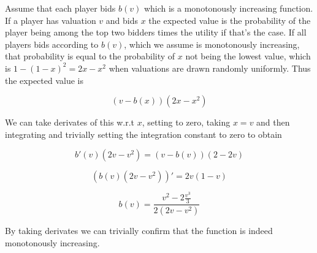 Assume that each player bids $b(v)$ which is a monotonously increasing function. If a player has valuation $v$ and bids $x$ the expected value is the probability of the player being among the top two bidders times the utility if that's the case. If all players bids according to $b(v)$, which we assume is monotonously increasing, that probability is equal to the probability of $x$ not being the lowest value, which is $1-(1-x)^2 = 2x-x^2$ when valuations are drawn randomly uniformly. Thus the expected value is

$$
(v-b(x))(2x-x^2)
$$

We can take derivates of this w.r.t $x$, setting to zero, taking $x=v$ and then integrating and trivially setting the integration constant to zero to obtain

$$
b'(v)(2v-v^2) = (v-b(v))(2-2v)
$$

$$
(b(v)(2v-v^2))' = 2  v (1-v)
$$

$$
b(v) = \frac{v^2 - 2 \frac{v^3}{3}}{2(2v-v^2)}
$$

By taking derivates we can trivially confirm that the function is indeed monotonously increasing.

